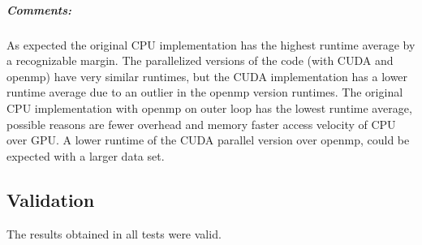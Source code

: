\subparagraph{Comments:} As expected the original CPU implementation has the highest runtime average by a recognizable margin. The parallelized versions of the code (with CUDA and openmp) have very similar runtimes, but the CUDA implementation has a lower runtime average due to an outlier in the openmp version runtimes. The original CPU implementation with openmp on outer loop has the lowest runtime average, possible reasons are fewer overhead and memory faster access velocity of CPU over GPU. A lower runtime of the CUDA parallel version over openmp, could be expected with a larger data set.

\subsection{Validation}
The results obtained in all tests were valid.
